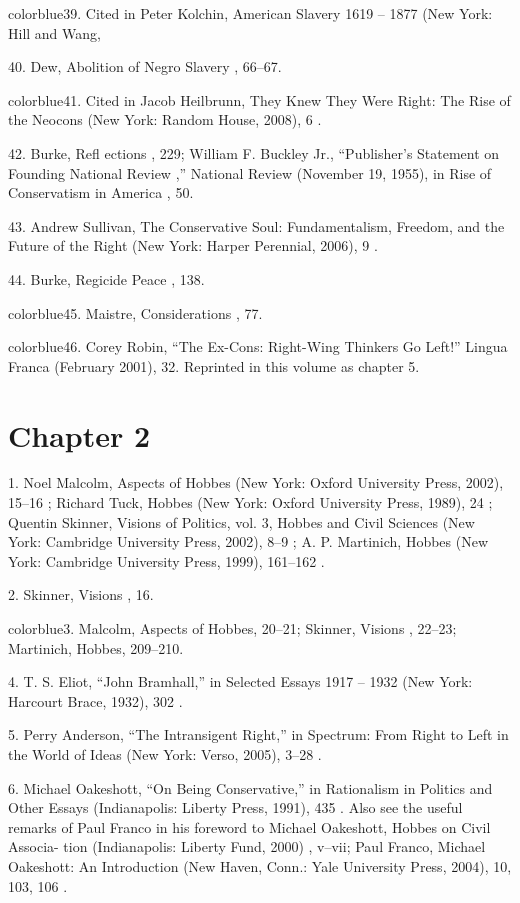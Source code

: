 	{color{blue}39}. Cited in Peter Kolchin, American Slavery 1619 – 1877 (New York: Hill and Wang,


	{\color{blue}40}. Dew, Abolition of Negro Slavery , 66–67.


	{color{blue}41}. Cited in Jacob Heilbrunn, They Knew They Were Right: The Rise of the Neocons (New York: Random House, 2008), 6 .


	{\color{blue}42}. Burke, Refl ections , 229; William F. Buckley Jr., “Publisher’s Statement on Founding National Review ,” National Review (November 19, 1955), in Rise of Conservatism in America , 50.


	{\color{blue}43}. Andrew Sullivan, The Conservative Soul: Fundamentalism, Freedom, and the Future of the Right (New York: Harper Perennial, 2006), 9 .


	{\color{blue}44}. Burke, Regicide Peace , 138.


	{color{blue}45}. Maistre, Considerations , 77.


	{color{blue}46}. Corey Robin, “The Ex-Cons: Right-Wing Thinkers Go Left!” Lingua Franca (February 2001), 32. Reprinted in this volume as chapter 5.


\section{Chapter 2}


	{\color{blue}1}. Noel Malcolm, Aspects of Hobbes (New York: Oxford University Press, 2002), 15–16 ; Richard Tuck, Hobbes (New York: Oxford University Press, 1989), 24 ; Quentin Skinner, Visions of Politics, vol. 3, Hobbes and Civil Sciences (New York: Cambridge University Press, 2002), 8–9 ; A. P. Martinich, Hobbes (New York: Cambridge University Press, 1999), 161–162 .


	{\color{blue}2}. Skinner, Visions , 16.


	{color{blue}3}. Malcolm, Aspects of Hobbes, 20–21; Skinner, Visions , 22–23; Martinich, Hobbes, 209–210.


	{\color{blue}4}. T. S. Eliot, “John Bramhall,” in Selected Essays 1917 – 1932 (New York: Harcourt Brace, 1932), 302 .


	{\color{blue}5}. Perry Anderson, “The Intransigent Right,” in Spectrum: From Right to Left in the World of Ideas (New York: Verso, 2005), 3–28 .


	{\color{blue}6}. Michael Oakeshott, “On Being Conservative,” in Rationalism in Politics and Other Essays (Indianapolis: Liberty Press, 1991), 435 . Also see the useful remarks of Paul Franco in his foreword to Michael Oakeshott, Hobbes on Civil Associa- tion (Indianapolis: Liberty Fund, 2000) , v–vii; Paul Franco, Michael Oakeshott: An Introduction (New Haven, Conn.: Yale University Press, 2004), 10, 103, 106 .


